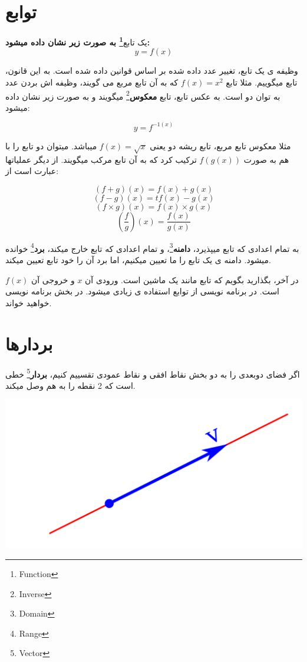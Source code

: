 \documentclass[14pt,a4paper]{memoir}
\begin{document}
	 \section{توابع}\label{functions}

یک تابع\textbf{\footnote{Function} به صورت زیر نشان داده میشود:
\[y = f(x)\]}

وظیفه ی یک تابع، تغییر عدد داده شده بر اساس قوانین داده شده است. به این قانون، تابع میگوییم. مثلا تابع \(f(x) = x^2\) که به آن تابع مربع می گویند، وظیفه اش بردن عدد به توان دو است. به عکس تابع، تابع \textbf{معکوس}\footnote{Inverse} میگویند و به صورت زیر نشان داده میشود:

\[y = f^{-1(x)}\]

مثلا معکوس تابع مربع، تابع ریشه دو یعنی $ f(x) = \sqrt{x} $ میباشد. میتوان دو تابع را با هم به صورت $ f(g(x)) $ ترکیب کرد که به آن تابع مرکب میگویند. از دیگر عملیاتها عبارت است از:

\[  (f + g)(x) = f(x) + g(x) \]
\[ (f - g)(x) = t f(x) - g(x) \]
\[  (f \times g)(x) =  f(x) \times g(x) \]
\[  \left(\frac{f}{g}\right)(x) =  \frac{f(x)}{g(x)} \]

به تمام اعدادی که تابع میپذیرد، \textbf{دامنه}\footnote{Domain}، و تمام اعدادی که تابع خارج میکند، \textbf{برد}\footnote{Range} خوانده میشود. دامنه ی یک تابع را ما تعیین میکنیم، اما برد آن را خود تابع تعیین میکند.

در آخر، بگذارید بگویم که تابع مانند یک ماشین است. ورودی آن $ x $ و خروجی آن $ f(x) $ است. در برنامه نویسی از توابع استفاده ی زیادی میشود. در بخش برنامه نویسی خواهید خواند.

\section{بردارها}\label{vector}

اگر فضای دوبعدی را به دو بخش نقاط افقی و نقاط عمودی تقسییم کنیم، \textbf{بردار}\footnote{Vector} خطی است که 2 نقطه را به هم وصل میکند.

\includegraphics*[scale=0.3]{Vector} 
\end{document}
